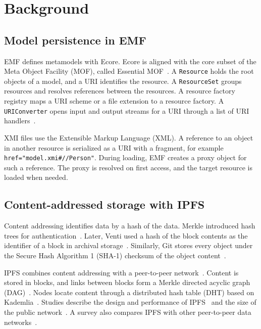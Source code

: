 \documentclass[iicol,pdflatex,sn-mathphys-num]{sn-jnl}
\theoremstyle{thmstylethree}%
\begin{document}
\section{Background}\label{sec:background}

\subsection{Model persistence in EMF}\label{sec:background-emf}

EMF defines metamodels with Ecore. Ecore is aligned with the core subset of the Meta Object Facility (MOF), called Essential MOF~\cite{steinberg2008emf,omg2016mof}. A \texttt{Resource} holds the root objects of a model, and a URI identifies the resource. A \texttt{ResourceSet} groups resources and resolves references between the resources. A resource factory registry maps a URI scheme or a file extension to a resource factory. A \texttt{URIConverter} opens input and output streams for a URI through a list of URI handlers~\cite{steinberg2008emf}.

XMI files use the Extensible Markup Language (XML). A reference to an object in another resource is serialized as a URI with a fragment, for example \verb|href="model.xmi#//Person"|. During loading, EMF creates a proxy object for such a reference. The proxy is resolved on first access, and the target resource is loaded when needed.

\subsection{Content-addressed storage with IPFS}\label{sec:background-ipfs}

Content addressing identifies data by a hash of the data. Merkle introduced hash trees for authentication~\cite{merkle1988signature}. Later, Venti used a hash of the block contents as the identifier of a block in archival storage~\cite{quinlan2002venti}. Similarly, Git stores every object under the Secure Hash Algorithm 1 (SHA-1) checksum of the object content~\cite{chacon2014progit}.

IPFS combines content addressing with a peer-to-peer network~\cite{benet2014ipfs}. Content is stored in blocks, and links between blocks form a Merkle directed acyclic graph (DAG)~\cite{benet2014ipfs}. Nodes locate content through a distributed hash table (DHT) based on Kademlia~\cite{maymounkov2002kademlia,psaras2020ipfs}. Studies describe the design and performance of IPFS~\cite{trautwein2022ipfs} and the size of the public network~\cite{henningsen2020mapping}. A survey also compares IPFS with other peer-to-peer data networks~\cite{daniel2022ipfsfriends}.
\end{document}
